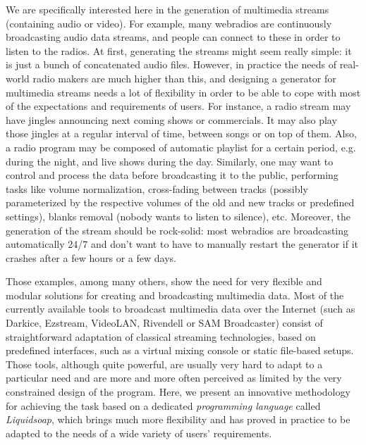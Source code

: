 \documentclass{llncs}
\newcommand{\eg}{{e.g.}}
\newcommand{\TODO}[1]{\marginpar{\tiny #1}}
\begin{document}
We are specifically interested here in the generation of multimedia streams
(containing audio or video). For example, many webradios are continuously
broadcasting audio data streams, and people can connect to these in order to
listen to the radios. At first, generating the streams might seem really simple:
it is just a bunch of concatenated audio files. However, in practice the needs
of real-world radio makers are much higher than this, and designing a generator
for multimedia streams needs a lot of flexibility in order to be able to cope
with most of the expectations and requirements of users. For instance, a radio
stream may have jingles announcing next coming shows or commercials. It may also
play those jingles at a regular interval of time, between songs or on top of
them. Also, a radio program may be composed of automatic playlist for a certain
period, \eg{} during the night, and live shows during the day. Similarly, one
may want to control and process the data before broadcasting it to the public,
performing tasks like volume normalization, cross-fading between tracks
(possibly parameterized by the respective volumes of the old and new tracks or
predefined settings), blanks removal (nobody wants to listen to silence),
etc. Moreover, the generation of the stream should be rock-solid: most webradios
are broadcasting automatically 24/7 and don't want to have to manually restart
the generator if it crashes after a few hours or a few days.

Those examples, among many others, show the need for very flexible and modular
solutions for creating and broadcasting multimedia data. Most of the currently
available tools to broadcast multimedia data over the Internet (such as Darkice,
Ezstream, VideoLAN, Rivendell or SAM Broadcaster) consist of straightforward
adaptation of classical streaming technologies, based on
predefined interfaces, such as a virtual mixing console or static file-based
setups. Those tools, although quite powerful, are usually very hard to adapt to
a particular need and are more and more often perceived as limited by the very
\TODO{DB "new" c'est abusé}
\TODO{RB c ok avec innovative ?}
constrained design of the program. Here, we present an innovative methodology for
achieving the task based on a dedicated \emph{programming language} called
\emph{Liquidsoap}, which brings much more flexibility and has proved in practice
to be adapted to the needs of a wide variety of users' requirements.
\end{document}
